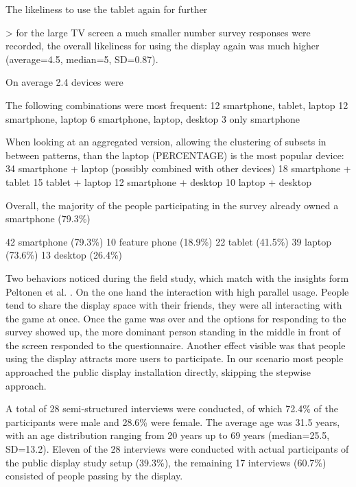 	The likeliness to use the tablet again for further 

		> for the large TV screen a much smaller number survey responses were recorded, the overall likeliness for using the display again was much higher (average=4.5, median=5, SD=0.87).



	On average 2.4 devices were 

	The following combinations were most frequent:
		12	smartphone, tablet, laptop
		12	smartphone, laptop
		6 	smartphone, laptop, desktop
		3 	only smartphone

	When looking at an aggregated version, allowing the clustering of subsets in between patterns, than the laptop (PERCENTAGE) is the most popular device:
		34 	smartphone + laptop (possibly combined with other devices)
		18	smartphone + tablet
		15	tablet + laptop
		12	smartphone + desktop
		10 	laptop + desktop

	Overall, the majority of the people participating in the survey already owned a smartphone (79.3\%)

		42	smartphone (79.3\%)
		10	feature phone (18.9\%)
		22	tablet (41.5\%)
		39	laptop (73.6\%)
		13	desktop (26.4\%)



Two behaviors noticed during the field study, which match with the insights form Peltonen et al. \cite{peltonen2008s}. On the one hand the interaction with high parallel usage. People tend to share the display space with their friends, they were all interacting with the game at once. Once the game was over and the options for responding to the survey showed up, the more dominant person standing in the middle in front of the screen responded to the questionnaire. Another effect visible was that people using the display attracts more users to participate.
In our scenario most people approached the public display installation directly, skipping the stepwise approach.



A total of 28 semi-structured interviews were conducted, of which 72.4\% of the participants were male and 28.6\% were female. The average age was 31.5 years, with an age distribution ranging from 20 years up to 69 years (median=25.5, SD=13.2). Eleven of the 28 interviews were conducted with actual participants of the public display study setup (39.3\%), the remaining 17 interviews (60.7\%) consisted of people passing by the display. 

